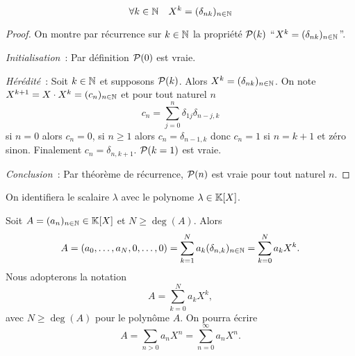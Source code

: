 \begin{lemme}
  \begin{equation}
    \forall k\in \N \quad X^k = (\delta_{nk})_{n \in \N}
  \end{equation}
\end{lemme}
\begin{proof}
  On montre par récurrence sur \(k \in \N\) la propriété \(\P(k)\) ``\(X^k = 
  (\delta_{nk})_{n \in \N}\)''.

  \emph{Initialisation}~: Par définition \(\P(0)\) est vraie.

  \emph{Hérédité}~: Soit \(k \in \N\) et supposons \(\P(k)\). Alors 
  \(X^k = (\delta_{nk})_{n \in \N}\). On note \(X^{k+1} = X \cdot X^k = (c_n)_{n \in 
  \N}\) et pour tout naturel \(n\)
  \begin{equation}
    c_n = \sum_{j = 0}^n \delta_{1j} \delta_{n-j,k}
  \end{equation}
  si \(n = 0\) alors \(c_n = 0\), si \(n \geqslant 1\) alors \(c_n = \delta_{n-1,k}\) 
  donc \(c_n = 1\) si \(n = k+1\) et zéro sinon. Finalement \(c_n = \delta_{n,k+1}\). 
  \(\P(k = 1)\) est vraie.

  \emph{Conclusion}~: Par théorème de récurrence, \(\P(n)\) est vraie pour tout 
  naturel \(n\).
\end{proof}

On identifiera le scalaire \(\lambda\) avec le polynome \(\lambda \in \K[X]\).

Soit \(A = (a_n)_{n \in \N} \in \K[X]\) et \(N \geqslant \deg(A)\). Alors
\begin{equation}
  A = (a_0, \ldots, a_N, 0, \ldots, 0) = \sum_{k = 1}^N a_k (\delta_{n,k})_{n \in 
  \N} = \sum_{k = 0}^N a_k X^k.
\end{equation}
Nous adopterons la notation
\begin{equation}
  A = \sum_{k = 0}^N a_k X^k,
\end{equation}
avec \(N \geqslant \deg(A)\) pour le polynôme \(A\). On pourra écrire
\begin{equation}
  A = \sum_{n>0} a_n X^n = \sum_{n = 0}^{\infty} a_n X^n.
\end{equation}

